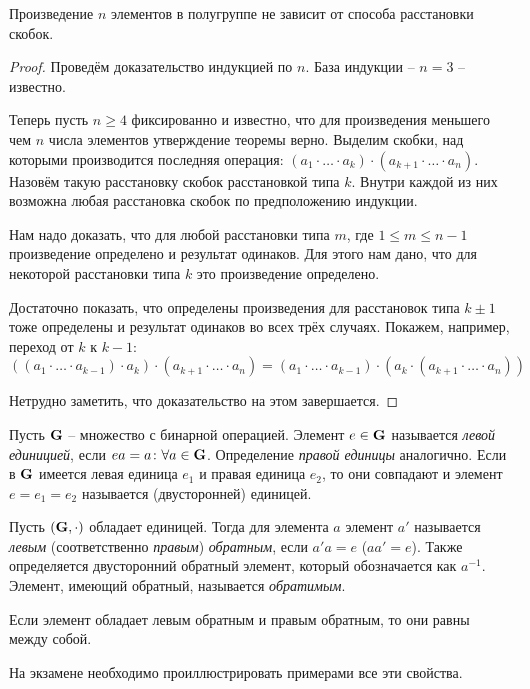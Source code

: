\begin{theorem}
  Произведение $n$ элементов в полугруппе не зависит от способа расстановки скобок.
\end{theorem}
\begin{proof}
  Проведём доказательство индукцией по $n$. База индукции -- $n=3$ -- известно.
  
  Теперь пусть $n\ge4$ фиксированно и известно, что для произведения меньшего чем $n$ числа элементов утверждение теоремы верно. Выделим скобки, над которыми производится последняя операция: $(a_1\cdot\dots\cdot a_k)\cdot(a_{k+1}\cdot\dots\cdot a_n)$. Назовём такую расстановку скобок расстановкой типа $k$. Внутри каждой из них возможна любая расстановка скобок по предположению индукции. 
  
  Нам надо доказать, что для любой расстановки типа $m$, где $1\le m\le n-1$ произведение определено и результат одинаков. Для этого нам дано, что для некоторой расстановки типа $k$ это произведение определено. 
  
  Достаточно показать, что определены произведения для расстановок типа $k\pm1$ тоже определены и результат одинаков во всех трёх случаях. Покажем, например, переход от $k$ к $k-1$:
  $$((a_1\cdot\dots\cdot a_{k-1})\cdot a_k)\cdot(a_{k+1}\cdot\dots\cdot a_n)=(a_1\cdot\dots\cdot a_{k-1})\cdot(a_k\cdot(a_{k+1}\cdot\dots\cdot a_n))$$
  
  Нетрудно заметить, что доказательство на этом завершается.
\end{proof}

\begin{df}
  Пусть $\mathbf{G}$ -- множество с бинарной операцией. Элемент $e\in\mathbf{G}$ называется \emph{левой единицией}, если $ea=a\colon\forall a\in\mathbf{G}$. Определение \emph{правой единицы} аналогично. Если в $\mathbf{G}$ имеется левая единица $e_1$ и правая единица $e_2$, то они совпадают и элемент $e=e_1=e_2$ называется (двусторонней) единицей.
\end{df}
\begin{df}
  Пусть $(\mathbf{G},\cdot)$ обладает единицей. Тогда для элемента $a$ элемент $a'$ называется \emph{левым} (соответственно \emph{правым}) \emph{обратным}, если $a'a=e$ ($aa'=e$). Также определяется двусторонний обратный элемент, который обозначается как $a^{-1}$. Элемент, имеющий обратный, называется \emph{обратимым}.
\end{df}
\begin{theorem}
  Если элемент обладает левым обратным и правым обратным, то они равны между собой.
\end{theorem}
\begin{note}
  На экзамене необходимо проиллюстрировать примерами все эти свойства. %
\end{note}

